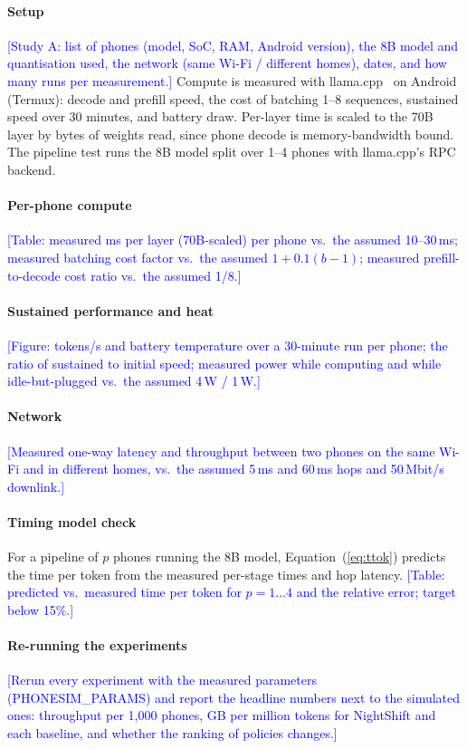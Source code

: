 \documentclass[preprint,review,12pt,authoryear]{elsarticle}
\newcommand{\Pending}[1]{\textcolor{blue}{[#1]}}
\begin{document}
\paragraph{Setup} \Pending{Study A: list of phones (model, SoC, RAM, Android
version), the 8B model and quantisation used, the network (same Wi-Fi /
different homes), dates, and how many runs per measurement.} Compute is
measured with llama.cpp~\citep{llamacpp} on Android (Termux): decode and
prefill speed, the cost of batching 1--8 sequences, sustained speed over
30 minutes, and battery draw. Per-layer time is scaled to the 70B layer by
bytes of weights read, since phone decode is memory-bandwidth bound. The
pipeline test runs the 8B model split over 1--4 phones with llama.cpp's RPC
backend.

\paragraph{Per-phone compute} \Pending{Table: measured ms per layer (70B-scaled)
per phone vs.\ the assumed 10--30\,ms; measured batching cost factor vs.\ the
assumed $1+0.1(b-1)$; measured prefill-to-decode cost ratio vs.\ the assumed
1/8.}

\paragraph{Sustained performance and heat} \Pending{Figure: tokens/s and
battery temperature over a 30-minute run per phone; the ratio of sustained to
initial speed; measured power while computing and while idle-but-plugged vs.\
the assumed 4\,W / 1\,W.}

\paragraph{Network} \Pending{Measured one-way latency and throughput between two
phones on the same Wi-Fi and in different homes, vs.\ the assumed 5\,ms and
60\,ms hops and 50\,Mbit/s downlink.}

\paragraph{Timing model check} For a pipeline of $p$ phones running the 8B
model, Equation~(\ref{eq:ttok}) predicts the time per token from the measured
per-stage times and hop latency. \Pending{Table: predicted vs.\ measured time
per token for $p=1\ldots4$ and the relative error; target below 15\%.}

\paragraph{Re-running the experiments} \Pending{Rerun every experiment with
the measured parameters (PHONESIM\_PARAMS) and report the headline numbers
next to the simulated ones: throughput per 1,000 phones, GB per million tokens
for NightShift and each baseline, and whether the ranking of policies changes.}
\end{document}
